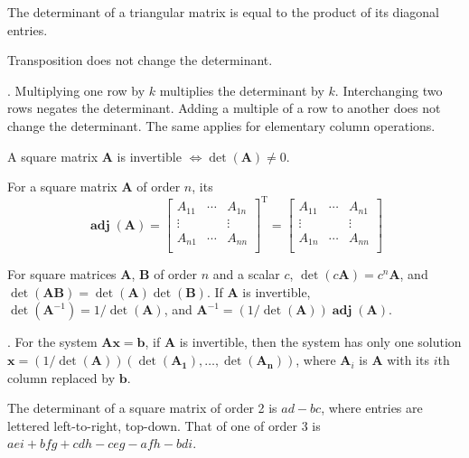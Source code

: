 \documentclass{slnotes}
\DeclareMathOperator*{\adj}{\mathbf{adj}}
\newcommand*{\TT}{\mathrm{T}}
\begin{document}
The determinant of a triangular matrix is equal to the product of its diagonal entries.

Transposition does not change the determinant.

. Multiplying one row by \(k\) multiplies the determinant by \(k\). Interchanging two rows negates the determinant. Adding a multiple of a row to another does not change the determinant. The same applies for elementary column operations.

A square matrix \(\mathbf{A}\) is invertible \(\Leftrightarrow \det(\mathbf{A}) \ne 0\).

For a square matrix \(\mathbf{A}\) of order \(n\), its 
\[\adj(\mathbf{A}) = \begin{bmatrix}
A_{11} & \cdots & A_{1n}\\
\vdots & & \vdots\\
A_{n1} & \cdots & A_{nn}\\
\end{bmatrix}^{\TT} =
\begin{bmatrix}
A_{11} & \cdots & A_{n1}\\
\vdots & & \vdots\\
A_{1n} & \cdots & A_{nn}\\
\end{bmatrix}\]

For square matrices \(\mathbf{A}\), \(\mathbf{B}\) of order \(n\) and a scalar \(c\), \(\det(c\mathbf{A}) = c^n\mathbf{A}\), and \(\det(\mathbf{AB}) = \det(\mathbf{A})\det(\mathbf{B})\). If \(\mathbf{A}\) is invertible, \(\det(\mathbf{A}^{-1}) = 1/\det(\mathbf{A})\), and \(\mathbf{A}^{-1} = (1/\det(\mathbf{A}))\adj(\mathbf{A})\).

. For the system \(\mathbf{Ax} = \mathbf{b}\), if \(\mathbf{A}\) is invertible, then the system has only one solution \(\mathbf{x} = (1/\det(\mathbf{A}))(\det(\mathbf{A_1}), \hdots, \det(\mathbf{A_n}))\), where \(\mathbf{A}_i\) is \(\mathbf{A}\) with its \(i\)th column replaced by \(\mathbf{b}\).

The determinant of a square matrix of order 2 is \(ad - bc\), where entries are lettered left-to-right, top-down. That of one of order 3 is \(aei + bfg + cdh - ceg - afh - bdi\).
\end{document}

